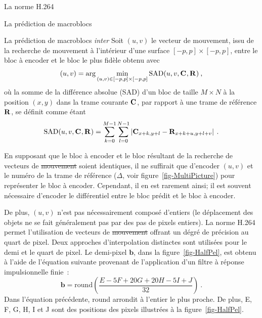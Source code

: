 \documentclass[letterpaper, twoside, 12pt,memoire]{thETS}
\providecommand{\DIFadd}[1]{{\protect\color{blue}\uwave{#1}}} %
\providecommand{\DIFdel}[1]{{\protect\color{red}\sout{#1}}}                      %
\providecommand{\DIFaddbegin}{} %
\providecommand{\DIFaddend}{} %
\providecommand{\DIFdelbegin}{} %
\providecommand{\DIFdelend}{} %
\begin{document}
\begin{chapter}{La norme H.264}
\begin{section}{La prédiction de macroblocs}
\begin{subsection}{La prédiction de macroblocs \textit{inter}}
Soit $(u,v)$ le vecteur de mouvement, issu de la recherche de mouvement à
l'intérieur d'une surface $[-p, p] \times [-p, p]$, entre le bloc à encoder et
le bloc le plus fidèle obtenu avec
\begin{equation}
\label{eq-Vectors}
(u, v) = \arg \min_{(u,v) \in [-p, p] \times [-p, p]} \textrm{SAD}(u, v, \mathbf{C}_{}, \mathbf{R}_{})
\:,
\end{equation}
où la somme de la différence absolue (SAD) d'un bloc de taille $M\times N$ à la position $(x,y)$
dans la trame courante $\mathbf{C}_{}$, par rapport à une trame de référence $\mathbf{R}_{}$,
se définit comme étant
\begin{equation}
\textrm{SAD}(u,v, \mathbf{C}_{}, \mathbf{R}_{}) = \sum_{k=0}^{M-1}\sum_{l=0}^{N-1} \left|
\mathbf{C}_{x+k,y+l} - \mathbf{R}_{x+k+u,y+l+v} \right|\:.
\end{equation}

En supposant que le bloc à encoder et le bloc résultant de la recherche de
vecteurs de \DIFdelbegin \DIFdel{mouvement }\DIFdelend \DIFaddbegin \DIFadd{mouvements }\DIFaddend soient identiques, il ne suffirait que d'encoder
$(u,v)$ et le numéro de la trame de référence ($\Delta$, voir
figure~\ref{fig-MultiPicture}) pour représenter le bloc à encoder. Cependant, il
en est rarement ainsi; il est souvent nécessaire d'encoder le différentiel entre
le bloc prédit et le bloc à encoder.

De plus, $(u,v)$ n'est pas nécessairement composé d'entiers (le déplacement des
objets ne se fait généralement pas par des pas de pixels entiers). La norme
H.264 permet l'utilisation de vecteurs de \DIFdelbegin \DIFdel{mouvement }\DIFdelend \DIFaddbegin \DIFadd{mouvements }\DIFaddend offrant un dégré de
précision au quart de pixel. Deux approches d'interpolation distinctes sont
utilisées pour le demi et le quart de pixel. Le demi-pixel $\mathbf{b}$, dans la
figure~\ref{fig-HalfPel}, est obtenu à l'aide de l'équation suivante provenant
de l'application d'un filtre à réponse impulsionnelle finie~:
\begin{equation}
\mathbf{b} = \text{round} \left(\frac{E - 5F + 20G + 20H - 5I + J}{32}
\right)\:.
\label{eq-DemiPixel}
\end{equation}
Dans l'équation précédente, round arrondit à l'entier le plus proche. De
plus, E, F, G, H, I et J sont des positions des pixels illustrées à la
figure~\ref{fig-HalfPel}. 


\end{subsection}
\end{section}
\end{chapter}
\end{document}

